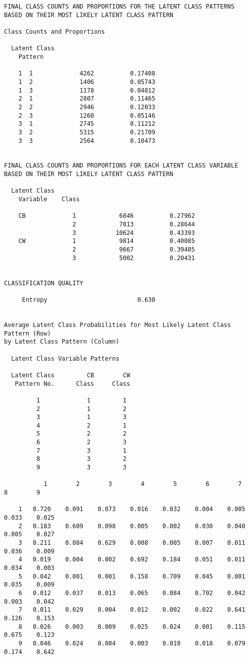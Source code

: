 \documentclass[]{article}
\begin{document}
\begin{verbatim}
FINAL CLASS COUNTS AND PROPORTIONS FOR THE LATENT CLASS PATTERNS
BASED ON THEIR MOST LIKELY LATENT CLASS PATTERN

Class Counts and Proportions

  Latent Class
    Pattern

    1  1             4262          0.17408
    1  2             1406          0.05743
    1  3             1178          0.04812
    2  1             2807          0.11465
    2  2             2946          0.12033
    2  3             1260          0.05146
    3  1             2745          0.11212
    3  2             5315          0.21709
    3  3             2564          0.10473


FINAL CLASS COUNTS AND PROPORTIONS FOR EACH LATENT CLASS VARIABLE
BASED ON THEIR MOST LIKELY LATENT CLASS PATTERN

  Latent Class
    Variable    Class

    CB             1            6846          0.27962
                   2            7013          0.28644
                   3           10624          0.43393
    CW             1            9814          0.40085
                   2            9667          0.39485
                   3            5002          0.20431


CLASSIFICATION QUALITY

     Entropy                         0.630


Average Latent Class Probabilities for Most Likely Latent Class Pattern (Row)
by Latent Class Pattern (Column)

  Latent Class Variable Patterns

  Latent Class         CB        CW
   Pattern No.      Class     Class

         1             1         1
         2             1         2
         3             1         3
         4             2         1
         5             2         2
         6             2         3
         7             3         1
         8             3         2
         9             3         3

           1        2        3        4        5        6        7        8        9

    1   0.720    0.091    0.073    0.016    0.032    0.004    0.005    0.033    0.025
    2   0.183    0.609    0.098    0.005    0.002    0.030    0.040    0.005    0.027
    3   0.211    0.084    0.629    0.008    0.005    0.007    0.011    0.036    0.009
    4   0.019    0.004    0.002    0.692    0.184    0.051    0.011    0.034    0.003
    5   0.042    0.001    0.001    0.158    0.709    0.045    0.001    0.035    0.009
    6   0.012    0.037    0.013    0.065    0.084    0.702    0.042    0.003    0.042
    7   0.011    0.029    0.004    0.012    0.002    0.022    0.641    0.126    0.153
    8   0.026    0.003    0.009    0.025    0.024    0.001    0.115    0.675    0.123
    9   0.046    0.024    0.004    0.003    0.010    0.018    0.079    0.174    0.642




\end{verbatim}
\end{document}
